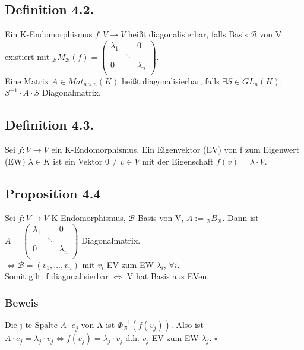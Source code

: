 \documentclass[a4paper,twoside]{article}
\newcommand{\threeXthree}[9] {
	\left( 
	\begin{matrix}
		#1 & #2 & #3\\
		#4 & #5 & #6\\
		#7 & #8 & #9\\
	\end{matrix}
	\right)
}
\begin{document}
\subsection*{Definition 4.2.}
Ein K-Endomorphismus $f:V\to V$ heißt diagonalisierbar, falls Basis $\mathcal B$ von V existiert mit ${_\mathcal B}M_\mathcal B(f) = \threeXthree{\lambda_1}{ }{0}
								{ }{\ddots}{ }
								{0}{ }{\lambda_n}$. \\
Eine Matrix $A \in Mat_{n\times n}(K)$ heißt diagonalisierbar, falls $\exists S \in GL_n(K)$: $S^{-1}\cdot A \cdot S$ Diagonalmatrix.
\subsection*{Definition 4.3.}
Sei $f:V\to V$ ein K-Endomorphismus. Ein Eigenvektor (EV) von f zum Eigenwert (EW) $\lambda \in K$ ist ein Vektor $0 \neq v \in V$ mit der Eigenschaft $f(v) = \lambda\cdot V$.
\subsection*{Proposition 4.4}
Sei $f:V \to V$ K-Endomorphismus, $\mathcal B$ Basis von V, $A:= {_\mathcal B}B_\mathcal B$. 
Dann ist $A=\threeXthree	{\lambda_1}{ }{0}
							{ }{\ddots}{ }
							{0}{ }{\lambda_n}$ Diagonalmatrix. \\
$\Leftrightarrow \mathcal B = (v_1,..., v_n)$ mit $v_i$ EV zum EW $\lambda_i$, $ \forall i$. \\
Somit gilt: f diagonalisierbar $\Leftrightarrow$ V hat Basis aus EVen.
\subsubsection*{Beweis}
Die j-te Spalte $A\cdot e_j$ von A ist $\Phi_{\mathcal B}^{-1}(f(v_j))$. Also ist $A\cdot e_j = \lambda_j\cdot v_j \Leftrightarrow f(v_j) = \lambda_j\cdot v_j$ d.h. $v_j$ EV zum EW $\lambda_j$. $\square$
\end{document}

